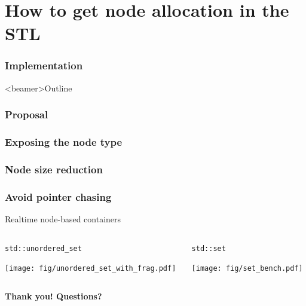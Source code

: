 \documentclass[10pt,aspectratio=169]{beamer}
\begin{document}
\part{How to get node allocation in the STL}

\section[Implementation]{Implementation}
\begin{frame}<beamer>{Outline}
\end{frame}

\section[Proposal]{Proposal}
\section[Exposing the node type]{Exposing the node type}
\section[Node size reduction]{Node size reduction}
\section[Avoid pointer chasing]{Avoid pointer chasing}

\begin{frame}{Realtime node-based containers}
    \begin{columns}
        \begin{column}{0.5\textwidth}
            \texttt{std::unordered\_set}
            \begin{center}
                \texttt{[image: fig/unordered\_set\_with\_frag.pdf]} \\
            \end{center}
        \end{column}

        \begin{column}{0.5\textwidth}
            \texttt{std::set}
            \begin{center}
                \texttt{[image: fig/set\_bench.pdf]} \\
            \end{center}
        \end{column}
    \end{columns}
\end{frame}

\begin{frame}{}
    \vspace{1cm}
    \begin{center}
        {\Large \bf Thank you! Questions?} 
    \end{center}
\end{frame}
\end{document}
